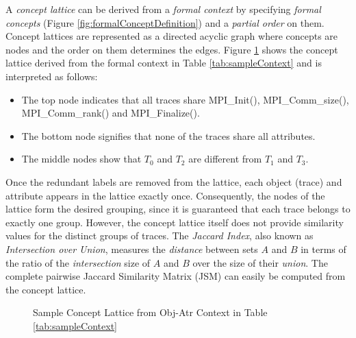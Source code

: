 A \textit{concept lattice} can be derived from a \textit{formal context} by specifying \textit{formal concepts} (Figure \ref{fig:formalConceptDefinition}) and a \textit{partial order} on them. Concept lattices are represented as a directed acyclic graph where concepts are nodes and the order on them determines the edges.
%
Figure \ref{fig:sampleCL} shows the concept lattice derived from the formal context in Table \ref{tab:sampleContext} and is interpreted as follows:

\begin{itemize}
    \item The top node indicates that all traces share MPI\_Init(), MPI\_Comm\_size(), MPI\_Comm\_rank() and MPI\_Finalize().
    \item The bottom node signifies that none of the traces share all attributes. 
    \item The middle nodes show that $T_0$ and $T_2$ are different from  $T_1$ and $T_3$.
\end{itemize}




Once the redundant labels are removed from the lattice, each object (trace) and attribute appears in the lattice exactly once. Consequently, the nodes of the lattice form the desired grouping, since it is guaranteed that each trace belongs to exactly one group. However, the concept lattice itself does not provide similarity values for the distinct groups of traces. The \textit{Jaccard Index}, also known as \textit{Intersection over Union}, measures the \textit{distance} between sets $A$ and $B$ in terms of the ratio of the \textit{intersection} size of $A$ and $B$ over the size of their \textit{union}.  The complete pairwise Jaccard Similarity Matrix (JSM) can easily be computed from the concept lattice.
%


\begin{figure}[t]
\centering
{}
\caption{Sample Concept Lattice from Obj-Atr Context in Table \ref{tab:sampleContext}}
\label{fig:sampleCL}
\end{figure}


